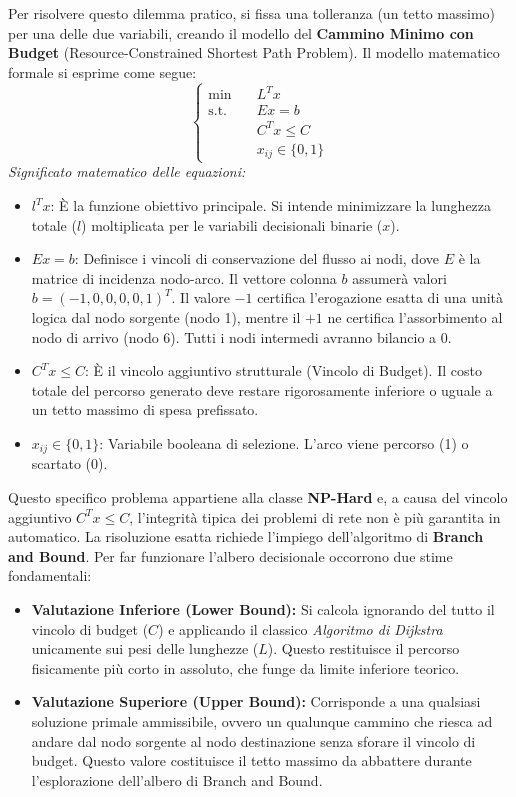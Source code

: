 \documentclass[12pt, a4paper]{article}
\begin{document}
	Per risolvere questo dilemma pratico, si fissa una tolleranza (un tetto massimo) per una delle due variabili, creando il modello del \textbf{Cammino Minimo con Budget} (Resource-Constrained Shortest Path Problem).
	Il modello matematico formale si esprime come segue:
	\[
	\left\{
	\begin{aligned}
		\min \quad & L^T x \\
		\text{s.t.} \quad & E x = b \\
		& C^T x \le C \\
		& x_{ij} \in \{0, 1\}
	\end{aligned}
	\right.
	\]
	\textit{Significato matematico delle equazioni:}
	\begin{itemize}
		\item $l^T x$: È la funzione obiettivo principale. Si intende minimizzare la lunghezza totale ($l$) moltiplicata per le variabili decisionali binarie ($x$).
		\item $E x = b$: Definisce i vincoli di conservazione del flusso ai nodi, dove $E$ è la matrice di incidenza nodo-arco. Il vettore colonna $b$ assumerà valori $b = (-1, 0, 0, 0, 0, 1)^T$. Il valore $-1$ certifica l'erogazione esatta di una unità logica dal nodo sorgente (nodo 1), mentre il $+1$ ne certifica l'assorbimento al nodo di arrivo (nodo 6). Tutti i nodi intermedi avranno bilancio a $0$.
		\item $C^T x \le C$: È il vincolo aggiuntivo strutturale (Vincolo di Budget). Il costo totale del percorso generato deve restare rigorosamente inferiore o uguale a un tetto massimo di spesa prefissato.
		\item $x_{ij} \in \{0, 1\}$: Variabile booleana di selezione. L'arco viene percorso (1) o scartato (0).
	\end{itemize}
	Questo specifico problema appartiene alla classe \textbf{NP-Hard} e, a causa del vincolo aggiuntivo $C^T x \le C$, l'integrità tipica dei problemi di rete non è più garantita in automatico.
	La risoluzione esatta richiede l'impiego dell'algoritmo di \textbf{Branch and Bound}. Per far funzionare l'albero decisionale occorrono due stime fondamentali:
	\begin{itemize}
		\item \textbf{Valutazione Inferiore (Lower Bound):} Si calcola ignorando del tutto il vincolo di budget ($C$) e applicando il classico \textit{Algoritmo di Dijkstra} unicamente sui pesi delle lunghezze ($L$). Questo restituisce il percorso fisicamente più corto in assoluto, che funge da limite inferiore teorico.
		\item \textbf{Valutazione Superiore (Upper Bound):} Corrisponde a una qualsiasi soluzione primale ammissibile, ovvero un qualunque cammino che riesca ad andare dal nodo sorgente al nodo destinazione senza sforare il vincolo di budget. Questo valore costituisce il tetto massimo da abbattere durante l'esplorazione dell'albero di Branch and Bound.
	\end{itemize}
	
\end{document}
